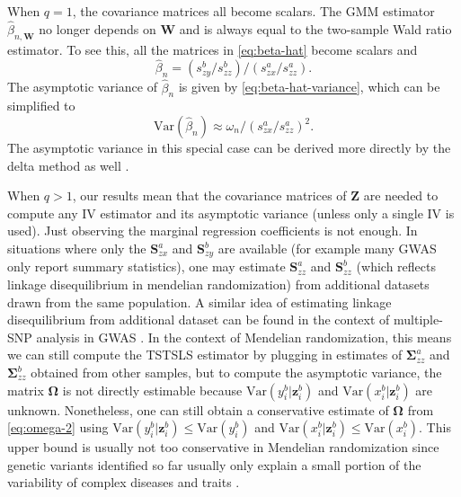 \documentclass[preprint]{imsart}
\begin{document}
\begin{remark}
  When $q = 1$, the covariance matrices all become scalars. The GMM estimator
  $\hat{\beta}_{n,\mathbf{W}}$ no longer depends on $\mathbf{W}$ and
  is always equal to the two-sample Wald ratio estimator. To see this,
  all the matrices in \eqref{eq:beta-hat} become scalars and
  \[
  \hat{\beta}_n = (s_{zy}^b/s_{zz}^b) / (s_{zx}^a/s_{zz}^a).
  \]
  The asymptotic variance of $\hat{\beta}_n$ is given by
  \eqref{eq:beta-hat-variance}, which can be simplified to
  \[
  \mathrm{Var}(\hat{\beta}_n) \approx \omega_n / (s_{zx}^a/s_{zz}^a)^2.
  \]
  The asymptotic variance in this special case can be derived more
  directly by the delta method as well \citep{burgess2015review}.
\end{remark}

\begin{remark} \label{rem:cov-mat}
  When $q > 1$, our results mean that the covariance matrices of
  $\mathbf{Z}$ are needed to compute any IV estimator and its
  asymptotic variance (unless only a single IV is used). Just
  observing the marginal regression coefficients
  is not enough. In situations where only the $\mathbf{S}_{zx}^a$ and
  $\mathbf{S}_{zy}^b$ are available (for example many GWAS only report
  summary statistics), one may estimate $\mathbf{S}_{zz}^a$ and
  $\mathbf{S}_{zz}^b$ (which reflects linkage disequilibrium in mendelian
  randomization) from additional datasets drawn from the same
  population. A similar idea of estimating linkage disequilibrium from
  additional dataset can be found in the context of multiple-SNP
  analysis in GWAS \citep{yang2012conditional}. In the context of
  Mendelian randomization, this means we can still compute the TSTSLS
  estimator by plugging in estimates of $\mathbf{\Sigma}_{zz}^a$ and
  $\mathbf{\Sigma}_{zz}^b$ obtained from other samples, but to compute
  the asymptotic variance, the matrix $\bm{\Omega}$ is not directly
  estimable because $\mathrm{Var}(y^b_i|\mathbf{z}^b_i)$ and $\mathrm{Var}(x^b_i|\mathbf{z}^b_i)$ are
  unknown. Nonetheless, one can still obtain a conservative estimate
  of $\bm{\Omega}$ from \eqref{eq:omega-2} using
  $\mathrm{Var}(y^b_i|\mathbf{z}^b_i) \le \mathrm{Var}(y^b_i)$ and
  $\mathrm{Var}(x^b_i|\mathbf{z}^b_i) \le \mathrm{Var}(x^b_i)$.
  This upper bound is usually not too conservative in Mendelian
  randomization since genetic variants identified so far usually only
  explain a small portion of the variability of complex diseases and
  traits \citep{manolio2009finding}.
\end{remark}
\end{document}
